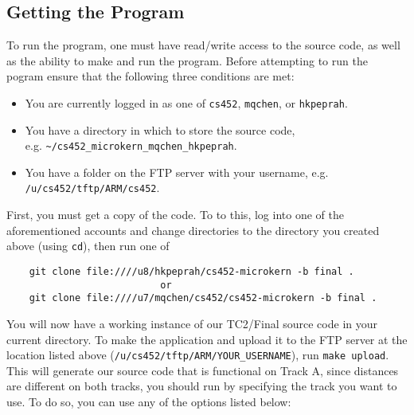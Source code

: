 \documentclass[12pt]{article}
\begin{document}
\subsection{Getting the Program}
To run the program, one must have read/write access to the source code, as well as the ability to make and run the program.  Before attempting to run the pogram ensure that the following three conditions are met:
\begin{itemize}
  \item You are currently logged in as one of \texttt{cs452}, \texttt{mqchen}, or \texttt{hkpeprah}.
  \item You have a directory in which to store the source code, \\ e.g. \texttt{\textasciitilde/cs452\_microkern\_mqchen\_hkpeprah}.
  \item You have a folder on the FTP server with your username, e.g. \texttt{/u/cs452/tftp/ARM/cs452}.
\end{itemize}
First, you must get a copy of the code.  To to this, log into one of the aforementioned accounts and change directories to the directory you created above (using \texttt{cd}), then run one of
\begin{center}
  \begin{verbatim}
    git clone file:////u8/hkpeprah/cs452-microkern -b final .
                           or
    git clone file:////u7/mqchen/cs452/cs452-microkern -b final .
  \end{verbatim}
\end{center}
\vspace{-0.5cm}You will now have a working instance of our TC2/Final source code in your current directory.  To make the application and upload it to the FTP server at the location listed above (\texttt{/u/cs452/tftp/ARM/YOUR\_USERNAME}), run \texttt{make upload}.  This will generate our source code that is functional on Track A, since distances are different on both tracks, you should run by specifying the track you want to use.  To do so, you can use any of the options listed below:
\begin{tabular}{|l|c|c|}
  
\end{tabular}
\\[1\baselineskip]
\end{document}
